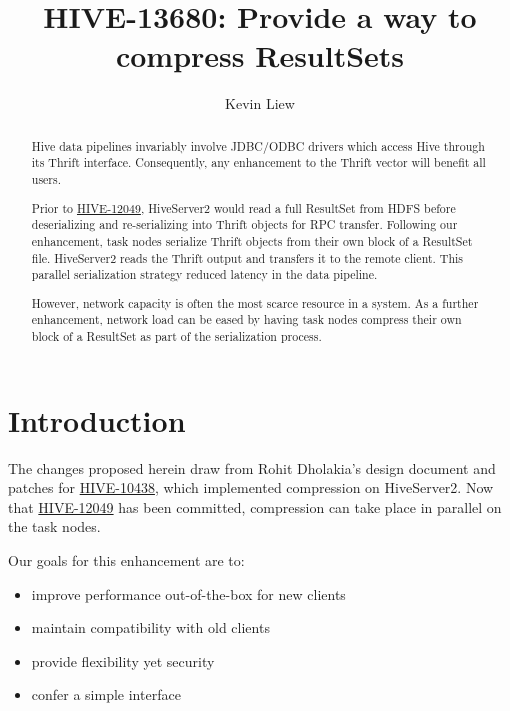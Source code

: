 \documentclass[11pt,a4paper]{article}
\title{HIVE-13680: Provide a way to compress ResultSets}
\author{Kevin Liew}
\begin{document}
\maketitle

\begin{abstract}
	
	Hive data pipelines invariably involve JDBC/ODBC drivers which access Hive through its Thrift interface. 
	Consequently, any enhancement to the Thrift vector will benefit all users.
	
	Prior to 
	\href{https://issues.apache.org/jira/browse/HIVE-12049}{HIVE-12049},
	HiveServer2 would read a full ResultSet from HDFS before deserializing and re-serializing into Thrift objects for RPC transfer.
	Following our enhancement, task nodes serialize Thrift objects from their own block of a ResultSet file. 
	HiveServer2 reads the Thrift output and transfers it to the remote client. 
	This parallel serialization strategy reduced latency in the data pipeline.
	
	However, network capacity is often the most scarce resource in a system. 
	As a further enhancement, network load can be eased by having task nodes compress their own block of a ResultSet as part of the serialization process.
	
\end{abstract}

\section{Introduction}
	
	The changes proposed herein draw from Rohit Dholakia's design document and patches for
	\href{https://issues.apache.org/jira/browse/HIVE-10438}{HIVE-10438}, which implemented compression on HiveServer2.
	Now that
	\href{https://issues.apache.org/jira/browse/HIVE-12049}{HIVE-12049}
	has been committed, compression can take place in parallel on the task nodes.
	
	Our goals for this enhancement are to:
	
	\begin{itemize}
		\item improve performance out-of-the-box for new clients
		\item maintain compatibility with old clients
		\item provide flexibility yet security
		\item confer a simple interface	
	\end{itemize}
	
\end{document}
